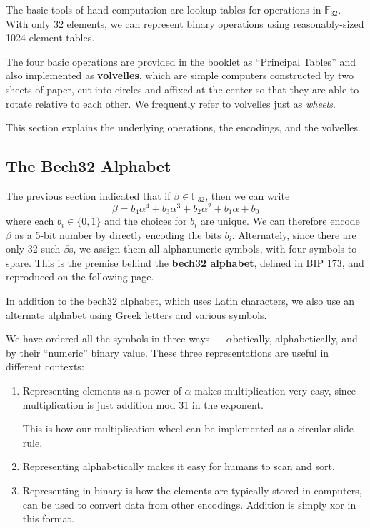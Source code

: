 \documentclass[letterpaper]{article}
\newcommand{\fttwo}{\mathbb{F}_{32}}
\begin{document}
The basic tools of hand computation are lookup tables for operations in $\fttwo$.
With only 32 elements, we can represent binary operations using reasonably-sized
1024-element tables.

The four basic operations are provided in the booklet as ``Principal Tables''
and also implemented as \textbf{volvelles}, which are simple computers constructed
by two sheets of paper, cut into circles and affixed at the center so that they
are able to rotate relative to each other. We frequently refer to volvelles just
as \emph{wheels}.

This section explains the underlying operations, the encodings, and the volvelles.

\subsection{The Bech32 Alphabet}

The previous section indicated that if $\beta\in\fttwo$, then we can write
\[ \beta = b_4\alpha^4 + b_3\alpha^3 + b_2\alpha^2 + b_1\alpha + b_0 \]
where each $b_i\in\{0, 1\}$ and the choices for $b_i$ are unique.
We can therefore encode $\beta$ as a 5-bit
number by directly encoding the bits $b_i$. Alternately, since there are
only 32 such $\beta$s, we assign them all alphanumeric symbols, with four
symbols to spare. This is the premise behind the \textbf{bech32 alphabet},
defined in BIP 173, and reproduced on the following page.

In addition to the bech32 alphabet, which uses Latin characters, we also use
an alternate alphabet using Greek letters and various symbols.

We have ordered all the symbols in three ways --- $\alpha$betically,
alphabetically, and by their ``numeric'' binary value. These three
representations are useful in different contexts:
\begin{enumerate}
\item Representing elements as a power of $\alpha$ makes multiplication
very easy, since multiplication is just addition mod 31 in the exponent.

This is how our multiplication wheel can be implemented as a circular slide rule.
\item Representing alphabetically makes it easy for humans to scan and sort.
\item Representing in binary is how the elements are typically stored in
computers, can be used to convert data from other encodings. Addition is
simply xor in this format.
\end{enumerate}
\end{document}
